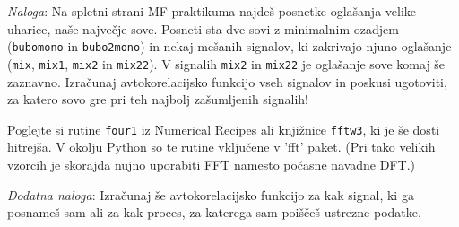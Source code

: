 \documentclass[slovene,11pt,a4paper]{article}
\begin{document}
\bigskip

{\it Naloga\/}: Na spletni strani MF praktikuma najdeš posnetke
oglašanja velike uharice, naše največje sove.  Posneti sta
dve sovi z minimalnim ozadjem ({\tt bubomono} in {\tt bubo2mono})
in nekaj mešanih signalov, ki zakrivajo njuno oglašanje
({\tt mix}, {\tt mix1}, {\tt mix2} in {\tt mix22}).
V signalih {\tt mix2} in {\tt mix22} je oglašanje sove
komaj še zaznavno.  Izračunaj avtokorelacijsko funkcijo 
vseh signalov in poskusi ugotoviti, za katero sovo gre
pri teh najbolj zašumljenih signalih!

Poglejte si rutine {\tt four1\/} iz Numerical Recipes
ali knjižnice {\tt fftw3}, ki je še dosti hitrejša. V okolju Python
so te rutine vključene v 'fft' paket. 
(Pri tako velikih vzorcih je skorajda nujno uporabiti FFT
namesto počasne navadne DFT.)

\bigskip

{\it Dodatna naloga\/}: Izračunaj še avtokorelacijsko funkcijo
za kak signal, ki ga posnameš sam ali za kak proces, za katerega
sam poiščeš ustrezne podatke.
\end{document}
